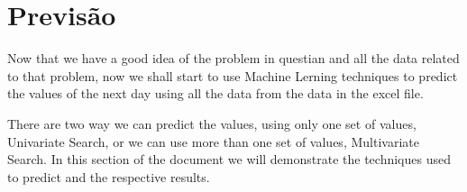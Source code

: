 \section{Previsão}

\quad Now that we have a good idea of the problem in questian and all the data related to that problem, now we shall start to use Machine Lerning techniques to predict the values of the next day using all the data from the data in the excel file. 

There are two way we can predict the values, using only one set of values, Univariate Search, or we can use more than one set of values, Multivariate Search. In this section of the document we will demonstrate the techniques used to predict and the respective results.


